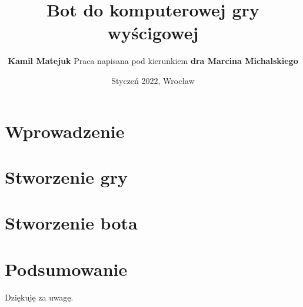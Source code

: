 \documentclass{beamer}
\title{Bot do komputerowej gry wyścigowej}
\author{
	\textbf{Kamil Matejuk}
	\newline \newline
	Praca napisana pod kierunkiem \newline \textbf{dra Marcina Michalskiego}
}
\date{Styczeń 2022, Wrocław}
\begin{document}
\begin{frame}[plain]{}
	\titlepage
\end{frame}


\section{Wprowadzenie}



\section{Stworzenie gry}






\section{Stworzenie bota}

% 







\section{Podsumowanie}


\begin{frame}{}
	\begin{center}
		\large{Dziękuję za uwagę.}
	\end{center}
\end{frame}
\end{document}
